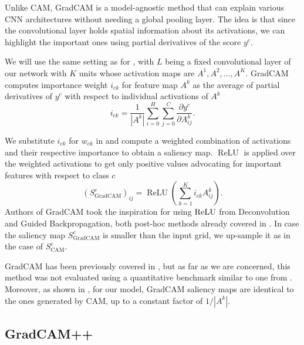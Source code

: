 Unlike CAM, GradCAM \cite{grad-cam} is a model-agnostic method that can explain various CNN architectures without needing a global pooling layer.
The idea is that since the convolutional layer holds spatial information about its activations, we can highlight the important ones using partial derivatives of the score $y^c$.

We will use the same setting as for , with $L$ being a fixed convolutional layer of our network with $K$ units whose activation maps are $A^1, A^2, ..., A^K$.
GradCAM computes importance weight $i_{ck}$ for feature map $A^k$ as the average of partial derivatives of $y^c$ with respect to individual activations of $A^k$ \cite{grad-cam}
\begin{equation}\label{grad-cam-weights}
    i_{ck} = \frac{1}{|A^k|} \sum_{i=0}^H \sum_{j=0}^C \frac{\partial y^c}{\partial A^k_{ij}}.
\end{equation}

We substitute $i_{ck}$ for $w_{ck}$ in  and compute a weighted combination of activations and their respective importance to obtain a saliency map.
$\operatorname{ReLU}$ is applied over the weighted activations to get only positive values advocating for important features with respect to class $c$ \cite{grad-cam}
\begin{equation}
    (S^c_{\text{GradCAM}})_{ij} = \operatorname{ReLU}(\sum_{k=1}^K i_{ck} A^k_{ij}).
\end{equation}
Authors of GradCAM took the inspiration for using $\operatorname{ReLU}$ from Deconvolution and Guided Backpropagation, both post-hoc methods already covered in \cite{gallo}.
In case the saliency map $S^c_{\text{GradCAM}}$ is smaller than the input grid, we up-sample it as in the case of $S^c_{\text{CAM}}$.

GradCAM has been previously covered in \cite{hruska-grad-cam, krajnansky-grad-cam, bajger-grad-cam}, but as far as we are concerned, this method was not evaluated using a quantitative benchmark similar to one from \cite{gallo}. Moreover, as shown in \cite{bajger-grad-cam}, for our model, GradCAM saliency maps are identical to the ones generated by CAM, up to a constant factor of ${1}/{|A^k|}$.

\subsection{GradCAM++}

